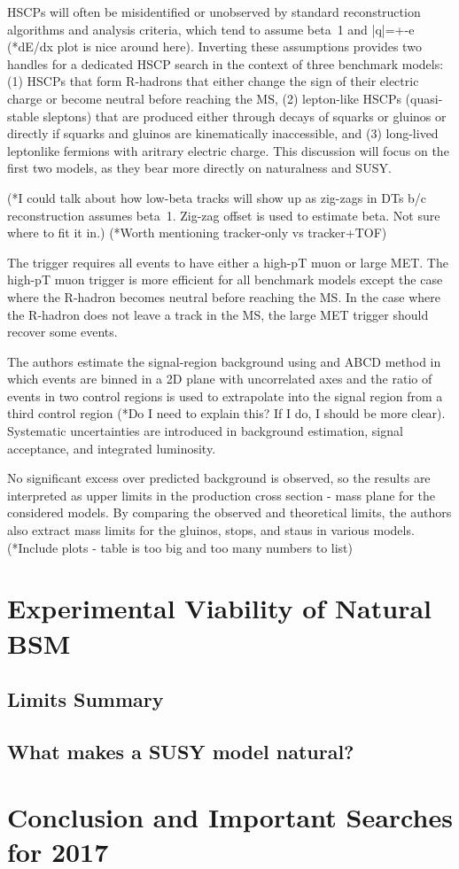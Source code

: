 \documentclass[12pt]{article}
\begin{document}
            HSCPs will often be misidentified or unobserved by standard reconstruction algorithms and analysis criteria, which tend to assume beta~1 and |q|=+-e (*dE/dx plot is nice around here). Inverting these assumptions provides two handles for a dedicated HSCP search in the context of three benchmark models: (1) HSCPs that form R-hadrons that either change the sign of their electric charge or become neutral before reaching the MS, (2) lepton-like HSCPs (quasi-stable sleptons) that are produced either through decays of squarks or gluinos or directly if squarks and gluinos are kinematically inaccessible, and (3) long-lived leptonlike fermions with aritrary electric charge. This discussion will focus on the first two models, as they bear more directly on naturalness and SUSY.

            (*I could talk about how low-beta tracks will show up as zig-zags in DTs b/c reconstruction assumes beta~1. Zig-zag offset is used to estimate beta. Not sure where to fit it in.) (*Worth mentioning tracker-only vs tracker+TOF)

            The trigger requires all events to have either a high-pT muon or large MET. The high-pT muon trigger is more efficient for all benchmark models except the case where the R-hadron becomes neutral before reaching the MS. In the case where the R-hadron does not leave a track in the MS, the large MET trigger should recover some events.  

            The authors estimate the signal-region background using and ABCD method in which events are binned in a 2D plane with uncorrelated axes and the ratio of events in two control regions is used to extrapolate into the signal region from a third control region (*Do I need to explain this? If I do, I should be more clear). Systematic uncertainties are introduced in background estimation, signal acceptance, and integrated luminosity.

            No significant excess over predicted background is observed, so the results are interpreted as upper limits in the production cross section - mass plane for the considered models. By comparing the observed and theoretical limits, the authors also extract mass limits for the gluinos, stops, and staus in various models. (*Include plots - table is too big and too many numbers to list)

\section{Experimental Viability of Natural BSM}
\subsection{Limits Summary}
\subsection{What makes a SUSY model natural?}

\section{Conclusion and Important Searches for 2017}

\clearpage
\pagebreak
\singlespacing
{}

\end{document}
